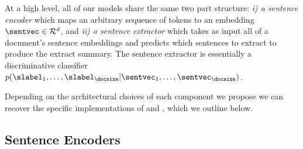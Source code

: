 At a high level, all of our models share the same two part structure: 
\textit{i) a sentence encoder} which maps an arbitrary sequence of tokens to 
an embedding $\sentvec \in \mathcal{R}^d$, and 
\textit{ii) a sentence extractor} which takes as input all of a document's 
sentence embeddings and predicts which sentences to extract to produce the 
extract summary. The sentence extractor is essentially a discriminative 
classifier $p(\slabel_1, \ldots, \slabel_{\docsize}| \sentvec_1, \ldots, \sentvec_{\docsize})$.

Depending on the architectural choices of each component we propose we 
can recover the specific implementations of \cite{cheng&lapata} and 
\cite{nallapati}, which we outline below.


\subsection{Sentence Encoders}
